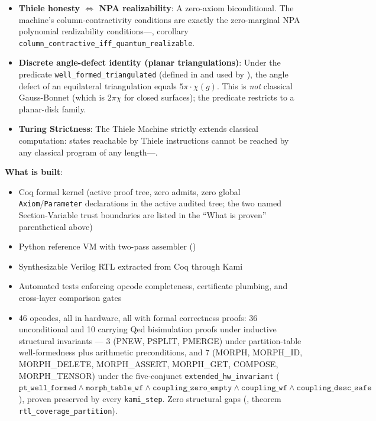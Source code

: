 \documentclass[9pt, a4paper, oneside, twocolumn]{extreport}
\theoremstyle{plain}
\theoremstyle{definition}
\theoremstyle{remark}
\begin{document}
\begin{itemize}
    \item \textbf{Thiele honesty $\iff$ NPA realizability}: A zero-axiom biconditional. The machine's column-contractivity conditions are exactly the zero-marginal NPA polynomial realizability conditions---, corollary \texttt{column\_contractive\_iff\_quantum\_realizable}.
    \item \textbf{Discrete angle-defect identity (planar triangulations)}: Under the predicate \texttt{well\_formed\_triangulated} (defined in  and used by ), the angle defect of an equilateral triangulation equals $5\pi \cdot \chi(g)$. This is \emph{not} classical Gauss-Bonnet (which is $2\pi\chi$ for closed surfaces); the predicate restricts to a planar-disk family.
    \item \textbf{Turing Strictness}: The Thiele Machine strictly extends classical computation: states reachable by Thiele instructions cannot be reached by any classical program of any length---.
\end{itemize}

\textbf{What is built}:
\begin{itemize}
    \item Coq formal kernel (active proof tree, zero admits, zero global \texttt{Axiom}/\texttt{Parameter} declarations in the active audited tree; the two named Section-Variable trust boundaries are listed in the ``What is proven'' parenthetical above)
    \item Python reference VM with two-pass assembler ()
    \item Synthesizable Verilog RTL extracted from Coq through Kami
    \item Automated tests enforcing opcode completeness, certificate plumbing, and cross-layer comparison gates
    \item 46 opcodes, all in hardware, all with formal correctness proofs: 36 unconditional and 10 carrying Qed bisimulation proofs under inductive structural invariants --- 3 (PNEW, PSPLIT, PMERGE) under partition-table well-formedness plus arithmetic preconditions, and 7 (MORPH, MORPH\_ID, MORPH\_DELETE, MORPH\_ASSERT, MORPH\_GET, COMPOSE, MORPH\_TENSOR) under the five-conjunct \texttt{extended\_hw\_invariant} ($\texttt{pt\_well\_formed} \wedge \texttt{morph\_table\_wf} \wedge \texttt{coupling\_zero\_empty} \wedge \texttt{coupling\_wf} \wedge \texttt{coupling\_desc\_safe}$), proven preserved by every \texttt{kami\_step}. Zero structural gaps (, theorem \texttt{rtl\_coverage\_partition}).
\end{itemize}
\end{document}
